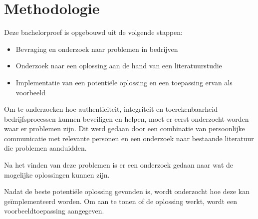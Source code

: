 
\chapter{Methodologie}
\label{ch:methodologie}


Deze bachelorproef is opgebouwd uit de volgende stappen:
\begin{itemize}
	\item Bevraging en onderzoek naar problemen in bedrijven
	\item Onderzoek naar een oplossing aan de hand van een literatuurstudie
	\item Implementatie van een potentiële oplossing en een toepassing ervan als voorbeeld
\end{itemize}

Om te onderzoeken hoe \gls{authenticiteit}, \gls{integriteit} en
\gls{toerekenbaarheid} bedrijfsprocessen kunnen beveiligen en helpen, moet er
eerst onderzocht worden waar er problemen zijn. Dit werd gedaan door een
combinatie van persoonlijke communicatie met relevante personen en een
onderzoek naar bestaande literatuur die problemen aanduidden.

Na het vinden van deze problemen is er een onderzoek gedaan naar wat de
mogelijke oplossingen kunnen zijn.

Nadat de beste potentiële oplossing gevonden is, wordt onderzocht hoe deze kan
geïmplementeerd worden. Om aan te tonen of de oplossing werkt, wordt een
voorbeeldtoepassing aangegeven.
